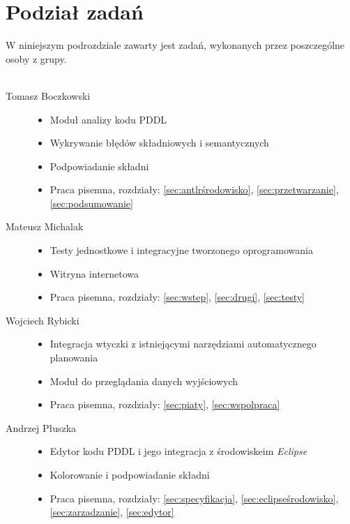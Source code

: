 \section{Podział zadań}
W niniejszym podrozdziale zawarty jest zadań, wykonanych przez poszczególne osoby z grupy.\\\\
\begin{description}
  \item[Tomasz Boczkowski] \hfill 
  \begin{itemize}
\item Moduł analizy kodu PDDL
\item Wykrywanie błędów składniowych i semantycznych
\item Podpowiadanie składni
\item Praca pisemna, rozdziały: \ref{sec:antlrśrodowisko}, \ref{sec:przetwarzanie}, \ref{sec:podsumowanie}
\end{itemize}
  \item[Mateusz Michalak] \hfill 
    \begin{itemize}
\item Testy jednostkowe i integracyjne tworzonego oprogramowania
\item Witryna internetowa
\item Praca pisemna, rozdziały: \ref{sec:wstep}, \ref{sec:drugi}, \ref{sec:testy}
\end{itemize}
  \item[Wojciech Rybicki] \hfill 
    \begin{itemize}
\item Integracja wtyczki z istniejącymi narzędziami automatycznego planowania
\item Moduł do przeglądania danych wyjściowych
\item Praca pisemna, rozdziały: \ref{sec:piaty}, \ref{sec:wspolpraca}
\end{itemize}
  \item[Andrzej Płuszka] \hfill 
    \begin{itemize}
\item Edytor kodu PDDL i jego integracja z środowiskeim \textit{Eclipse}
\item Kolorowanie i podpowiadanie składni
\item Praca pisemna, rozdziały: \ref{sec:specyfikacja}, \ref{sec:eclipseśrodowisko}, \ref{sec:zarzadzanie}, \ref{sec:edytor}
\end{itemize}
\end{description}




